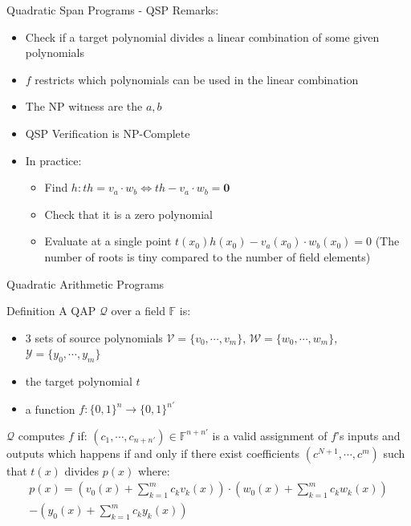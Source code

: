 \documentclass[handout]{beamer}
\begin{document}
\begin{frame}[allowframebreaks]{Quadratic Span Programs - QSP}
Remarks: 

\begin{itemize}
    \item Check if a target polynomial divides a linear combination of some given polynomials
    \item $f$ restricts which polynomials can be used in the linear combination
    \item The NP witness are the $a,b$
    \item QSP Verification is NP-Complete 
    \item In practice:
    \begin{itemize}
        \item Find $h: th = v_a \cdot w_b \Leftrightarrow th - v_a \cdot w_b = \textbf{0}$       
        \item Check that it is a zero polynomial
        \item Evaluate at a single point $t(x_0)h(x_0) - v_a(x_0) \cdot w_b(x_0) = 0$ (The number of roots is tiny compared to the number of field elements)
     \end{itemize}
\end{itemize} 
\end{frame}

\begin{frame}[allowframebreaks]{Quadratic Arithmetic Programs}
\begin{block}{Definition}
A QAP $\mathcal{Q}$ over a field $\mathbb{F}$ is:
\begin{itemize}
    \item 3 sets of source polynomials $\mathcal{V} = \{v_0, \cdots, v_m \}$, $\mathcal{W} = \{ w_0, \cdots, w_m \}$, $\mathcal{Y}  = \{y_0, \cdots, y_m \}$
    \item the target polynomial $t$
    \item a function $f : \{0,1\}^n \rightarrow \{0,1\}^{n'}$
\end{itemize}
\end{block}

\framebreak

$\mathcal{Q}$ computes $f$ if:
 $ (c_1, \cdots ,c_{n+n'}) \in \mathbb{F}^{n+n'}$ is a valid assignment of
$f$’s inputs and outputs which happens
if and only if there exist coefficients $(c^{N+1},\cdots,c^m)$ such that $t(x)$ divides $p(x)$ where:
\begin{align*}
p(x) = (v_0(x)+\sum_{k=1}^m c_k v_k(x)) \cdot (w_0(x)+  \sum_{k=1}^m c_k w_k(x))\\ - (y_0(x)+\sum_{k=1}^m c_k y_k(x))
\end{align*}
 
\end{frame}
\end{document}
